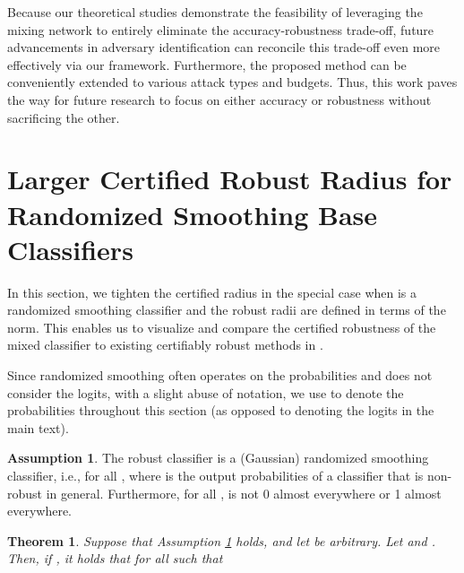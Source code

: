 \documentclass[11pt, letterpaper]{article}
\theoremstyle{plain}
\newtheorem{theorem}{Theorem}
\theoremstyle{definition}
\newtheorem{assumption}{Assumption}
\begin{document}
Because our theoretical studies demonstrate the feasibility of leveraging the mixing network to entirely eliminate the accuracy-robustness trade-off, future advancements in adversary identification can reconcile this trade-off even more effectively via our framework. Furthermore, the proposed method can be conveniently extended to various attack types and budgets. Thus, this work paves the way for future research to focus on either accuracy or robustness without sacrificing the other.








\newpage
\appendix

\section{Larger Certified Robust Radius for Randomized Smoothing Base Classifiers} \label{sec:rs_radius}

In this section, we tighten the certified radius in the special case when  is a randomized smoothing classifier and the robust radii are defined in terms of the  norm. This enables us to visualize and compare the certified robustness of the mixed classifier to existing certifiably robust methods in .

Since randomized smoothing often operates on the probabilities and does not consider the logits, with a slight abuse of notation, we use  to denote the probabilities throughout this section (as opposed to denoting the logits in the main text).

\begin{assumption}
	\label{as:randomized_smoothing}
	The robust classifier  is a (Gaussian) randomized smoothing classifier, i.e.,  for all , where  is the output probabilities of a classifier that is non-robust in general. Furthermore, for all ,  is not 0 almost everywhere or 1 almost everywhere.
\end{assumption}

\begin{theorem}
	\label{thm:randomized_smoothing}
	Suppose that Assumption \ref{as:randomized_smoothing} holds, and let  be arbitrary. Let  and . Then, if , it holds that  for all  such that
	
\end{theorem}
\end{document}
